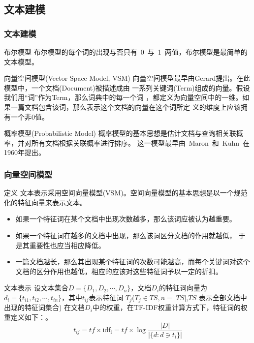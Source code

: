 \documentclass[CJKutf8, table, handout]{beamer}
\begin{document}
\begin{CJK}{UTF8}{gbsn}
\subsection{文本建模}
\begin{frame}
  \frametitle{文本建模}
  \begin{small}
  \begin{block}{布尔模型}
    布尔模型的每个词的出现与否只有~0~与~1~两值，布尔模型是最简单的文本模型。
  \end{block}
  \pause
  \begin{block}{向量空间模型(Vector Space Model, VSM)}
    向量空间模型最早由Gerard提出\cite{Salton}。在此模型中，一个文档(Document)被描述成由
    一系列关键词(Term)组成的向量。假设我们用``词''作为Term，那么词典中的每一个词
    ，都定义为向量空间中的一维。如果一篇文档包含该词，那么表示这个文档的向量在这个词所定
    义的维度上应该拥有一个非0值。
  \end{block}
  \pause
  \begin{block}{概率模型(Probabilistic Model)}
    概率模型的基本思想是估计文档与查询相关联概率，并对所有文档根据关联概率进行排序。
    这一模型最早由~Maron~和~Kuhn~在1960年提出。
  \end{block}
\end{small}
\end{frame}

\begin{frame}
  \frametitle{向量空间模型\cite{Wikipedia-IR}}
  \begin{tiny}
    \begin{block}{定义}
      文本表示采用空间向量模型(VSM)。空间向量模型的基本思想是以一个规范化的特征向量来表示文本。
      \begin{itemize}
          \item{如果一个特征词在某个文档中出现次数越多，那么该词应被认为越重要。}
          \item{如果一个特征词在越多的文档中出现，那么该词区分文档的作用就越低，
            于是其重要性也应当相应降低。}
          \item{一篇文档越长，那么其出现某个特征词的次数可能越高，而每个关键词对这个
            文档的区分作用也越低，相应的应该对这些特征词予以一定的折扣。}
        \end{itemize}
    \end{block}
  \end{tiny}
  \pause
  \begin{tiny}
    \begin{block}{文本表示}
      设文本集合$D = \{D_1, D_2, \cdots, D_n\}$，文档$D_i$的特征词向量为
      $d_i = \{t_{i1}, t_{i2}, \cdots, t_{in}\}$，其中$t_{ij}$表示特征词
      $T_j$($T_j \in TS, n = \vert TS \vert$,$TS$ 表示全部文档中出现的特征词集合)
      在文档$D_i$中的权重，在TF-IDF权重计算方式下，特征词的权重定义如下：。
      \pause
      $$
      t_{ij} = tf \times \mathrm{idf_i} = tf \times \log \frac{|D|}{|\{d: d \ni t_{i}\}|}
      $$
    \end{block}
  \end{tiny}
\end{frame}


\end{CJK}
\end{document}
